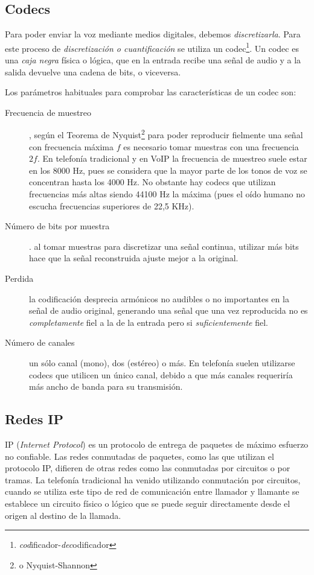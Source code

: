 \subsection{Codecs}
\label{sec:codecs-1}

Para poder enviar la voz mediante medios digitales, debemos \emph{discretizarla}. Para este proceso de \emph{discretización o cuantificación} se utiliza un codec\footnote{\emph{cod}ificador-\emph{dec}odificador}. Un codec es una \emph{caja negra} física o lógica, que en la entrada recibe una señal de audio y a la salida devuelve una cadena de bits, o viceversa.

Los parámetros habituales para comprobar las características de un codec son:

\begin{description}
\item[Frecuencia de muestreo], según el Teorema de Nyquist\footnote{o Nyquist-Shannon} para poder reproducir fielmente una señal con frecuencia máxima $f$ es necesario tomar muestras con una frecuencia $2f$. En telefonía tradicional y en VoIP la frecuencia de muestreo suele estar en los 8000 Hz, pues se considera que la mayor parte de los tonos de voz se concentran hasta los 4000 Hz. No obstante hay codecs que utilizan frecuencias más altas siendo 44100 Hz la máxima (pues el oído humano no escucha frecuencias superiores de 22,5 KHz).
\item[Número de bits por muestra]. al tomar muestras para discretizar una señal continua, utilizar más bits hace que la señal reconstruida ajuste mejor a la original.
\item[Perdida] la codificación desprecia armónicos no audibles o no importantes en la señal de audio original, generando una señal que una vez reproducida no es \emph{completamente} fiel a la de la entrada pero si \emph{suficientemente} fiel.
\item[Número de canales] un sólo canal (mono), dos (estéreo) o más. En telefonía suelen utilizarse codecs que utilicen un único canal, debido a que más canales requeriría más ancho de banda para su transmisión.
\end{description}



\subsection{Redes IP}
\label{sec:redes-ip}

IP (\emph{Internet Protocol}) es un protocolo de entrega de paquetes de máximo esfuerzo no confiable. Las redes conmutadas de paquetes, como las que utilizan el protocolo IP, difieren de otras redes como las conmutadas por circuitos o por tramas. La telefonía tradicional ha venido utilizando conmutación por circuitos, cuando se utiliza este tipo de red de comunicación entre llamador y llamante se establece un circuito físico o lógico que se puede seguir directamente desde el origen al destino de la llamada.

